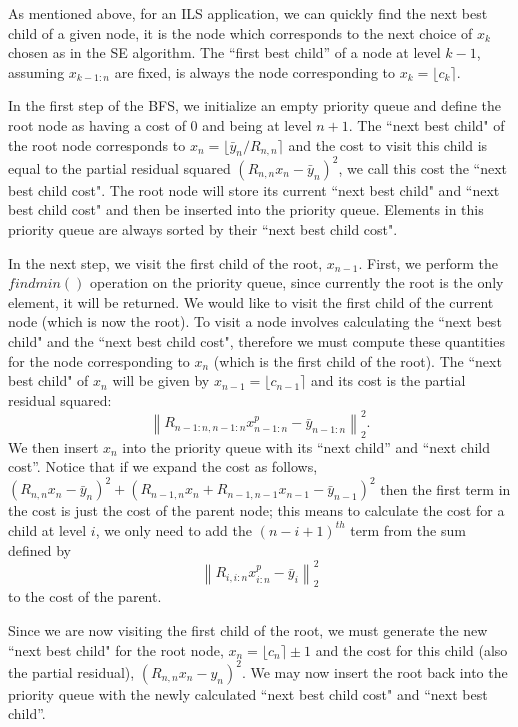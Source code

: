 \documentclass[12pt,Bold,letterpaper]{mcgilletdclass}
\begin{document}
As mentioned above, for an ILS application, we can quickly find the next best child of a given node, it is the node which corresponds to the next choice of $x_k$ chosen as in the SE algorithm. The ``first best child'' of a node at level $k-1$, assuming $x_{k-1:n}$ are fixed, is always the node corresponding to $x_k = \lfloor c_k \rceil$.

In the first step of the BFS, we initialize an empty priority queue and define the root node as having a cost of $0$ and being at level $n+1$. The ``next best child" of the root node corresponds to $x_n = \lfloor \bar{y}_n/R_{n,n} \rceil$ and the cost to visit this child is equal to the partial residual squared $(R_{n,n}x_n - \bar{y}_n)^2$, we call this cost the ``next best child cost". The root node will store its current ``next best child" and ``next best child cost" and then be inserted into the priority queue. Elements in this priority queue are always sorted by their ``next best child cost".

In the next step, we visit the first child of the root, $x_{n-1}$. First, we perform the $findmin()$ operation on the priority queue, since currently the root is the only element, it will be returned. We would like to visit the first child of the current node (which is now the root). To visit a node involves calculating the ``next best child" and the ``next best child cost", therefore we must compute these quantities for the node corresponding to $x_{n}$ (which is the first child of the root). The ``next best child" of $x_n$ will be given by $x_{n-1} = \lfloor c_{n-1} \rceil$ and its cost is the partial residual squared: $$\left \| R_{n-1:n,n-1:n}x_{n-1:n}^p - \bar{y}_{n-1:n}\right \|_2^2.$$ We then insert $x_n$ into the priority queue with its ``next child'' and ``next child cost''. Notice that if we expand the cost as follows, $(R_{n,n}x_n - \bar{y}_n)^2 + (R_{n-1,n}x_n + R_{n-1,n-1}x_{n-1} - \bar{y}_{n-1})^2$ then the first term in the cost is just the cost of the parent node; this means to calculate the cost for a child at level $i$, we only need to add the $(n-i+1)^{th}$ term from the sum defined by $$\left \| R_{i,i:n}x_{i:n}^p - \bar{y}_{i}\right \|_2^2$$ to the cost of the parent.

Since we are now visiting the first child of the root, we must generate the new ``next best child" for the root node, $x_n = \lfloor c_n \rceil \pm 1$ and the cost for this child (also the partial residual), $(R_{n,n}x_n - y_n)^2$. We may now insert the root back into the priority queue with the newly calculated ``next best child cost" and ``next best child''.
 
\end{document}
